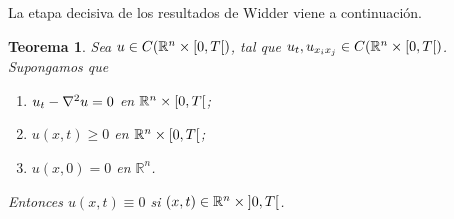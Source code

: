 \documentclass{article}
\newcommand{\realNumbers}{\mathbb{R}}
\newtheorem{theorem}{Teorema}
\theoremstyle{definition}
\theoremstyle{remark}
\newcommand{\leftOpenInterval}{\left]}
\newcommand{\rightOpenInterval}{\right[}
\newcommand{\leftClosedInterval}{\left[}
\newcommand{\rightClosedInterval}{\right]}
\newcommand{\interval}[3]{%
  \ifstrequal{#1}{oo}{%
    \leftOpenInterval #2, #3 \rightOpenInterval%
  }{%
    \ifstrequal{#1}{co}{%
      \leftClosedInterval #2, #3 \rightOpenInterval%
    }{%
      \ifstrequal{#1}{oc}{
        \leftOpenInterval #2, #3 \rightClosedInterval%
      }{%
        \ifstrequal{#1}{cc}{
          \leftClosedInterval #2, #3 \rightClosedInterval
        }{%
        }%
      }%
    }%
  }%
}
\begin{document}
  La etapa decisiva de los resultados de Widder viene a continuación.
  \begin{theorem}
    Sea \(u \in C(\realNumbers^n \times \interval{co}{0}{T})\), tal que \(u_t, u_{x_i x_j} \in C(\realNumbers^n \times \interval{co}{0}{T})\).
    Supongamos que
    \begin{enumerate}
      \item \(u_t - \laplacian u = 0\) en \(\realNumbers^n \times \interval{co}{0}{T}\);
      \item \(u(x, t) \geq 0\) en \(\realNumbers^n \times \interval{co}{0}{T}\);
      \item \(u(x, 0) = 0\) en \(\realNumbers^n\).
    \end{enumerate}
    Entonces \(u(x, t) \equiv 0\) si \((x, t) \in \realNumbers^n \times \interval{oo}{0}{T}\).
  \end{theorem}
\end{document}
